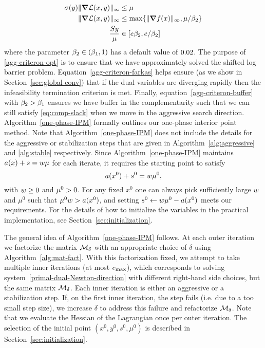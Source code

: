 \documentclass{article}
\begin{document}
\begin{subequations}\label{agg-criteron}
\begin{flalign}
\sigma (y) \| \grad \mathcal{L}(x, y) \|_{\infty} &\le \mu   \label{agg-criteron-opt} \\
\| \grad \mathcal{L}(x, y) \|_{\infty} &\le  \max\{ \| \grad f(x) \|_{\infty} ,  \mu / \beta_{2} \} \label{agg-criteron-farkas} \\
 \frac{S y}{\mu} &\in [ e \beta_{2}, e / \beta_{2} ] \label{agg-criteron-buffer}
\end{flalign}
\end{subequations}
where the parameter $\beta_{2} \in (\beta_{1}, 1)$ has a default value of $0.02$. The purpose of \eqref{agg-criteron-opt} is to ensure that we have approximately solved the shifted log barrier problem. Equation~\eqref{agg-criteron-farkas} helps ensure (as we show in Section~\ref{sec:global-conv}) that if the dual variables are diverging rapidly then the infeasibility termination criterion is met. Finally, equation~\eqref{agg-criteron-buffer} with $\beta_{2} > \beta_{1}$ ensures we have buffer in the complementarity such that we can still satisfy \eqref{eq:comp-slack} when we move in the aggressive search direction. Algorithm~\ref{one-phase-IPM} formally outlines our one-phase interior point method. Note that Algorithm~\ref{one-phase-IPM} does not include the details for the aggressive or stabilization steps that are given in Algorithm~\ref{alg:aggressive} and \ref{alg:stable} respectively. Since Algorithm~\ref{one-phase-IPM} maintains $a(x) + s = w \mu$ for each iterate, it requires the starting point to satisfy
$$
a(x^{0}) + s^{0} = w \mu^{0},
$$
with $w \ge 0$ and $\mu^{0} > 0$. For any fixed $x^{0}$ one can always pick sufficiently large $w$ and $\mu^{0}$ such that $\mu^{0} w > a(x^{0})$, and setting $s^{0} \gets w \mu^{0} - a(x^{0})$ meets our requirements. For the details of how to initialize the variables in the practical implementation, see Section~\ref{sec:initialization}.

The general idea of Algorithm~\ref{one-phase-IPM} follows. At each outer iteration we factorize the matrix $\mathcal{M}_{\delta}$ with an appropriate choice of $\delta$ using Algorithm~\ref{alg:mat-fact}. With this factorization fixed, we attempt to take multiple inner iterations (at most $c_{\max}$), which corresponds to solving system~\eqref{primal-dual-Newton-direction} with different right-hand side choices, but the same matrix $\mathcal{M}_{\delta}$. Each inner iteration is either an aggressive or a stabilization step. If, on the first inner iteration, the step fails (i.e. due to a too small step size), we increase $\delta$ to address this failure and refactorize $\mathcal{M}_{\delta}$. Note that we evaluate the Hessian of the Lagrangian once per outer iteration. The selection of the initial point $(x^{0}, y^{0}, s^{0}, \mu^{0})$ is described in Section~\ref{sec:initialization}.
\end{document}
